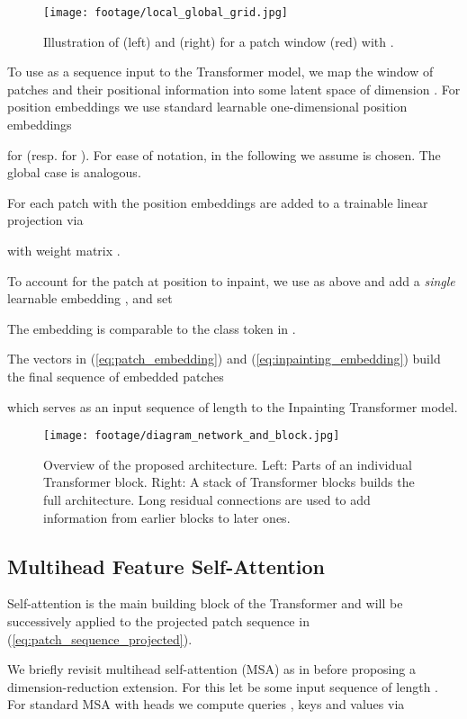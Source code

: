 \documentclass[final,5p,times,twocolumn]{elsarticle}
\begin{document}
	\begin{figure}[t]
		\centering
		\texttt{[image: footage/local\_global\_grid.jpg]}
		\caption{Illustration of  (left) and  (right) for a patch window (red) with .}
		\label{fig:window_locations}
	\end{figure}
	
	To use as a sequence input to the Transformer model, we map the window of patches and their positional information into some latent space of dimension . For position embeddings we use standard learnable one-dimensional position embeddings
	
	for  (resp.  for ). For ease of notation, in the following we assume  is chosen. The global case is analogous.
	
	For each patch  with  the position embeddings are added to a trainable linear projection via
	
	
	with weight matrix .
	
	To account for the patch at position  to inpaint, we use  as above and add a {\em single} learnable embedding , and set
	
	The embedding  is comparable to the class token in \cite{devlin2019bert}.
	
	The vectors in (\ref{eq:patch_embedding}) and (\ref{eq:inpainting_embedding}) build the final sequence of embedded patches
	
	which serves as an input sequence of length  to the Inpainting Transformer model.
	
	\begin{figure*}[t]
		\centering
		\texttt{[image: footage/diagram\_network\_and\_block.jpg]}
		\caption{Overview of the proposed architecture. Left: Parts of an individual Transformer block. Right: A stack of Transformer blocks builds the full architecture. Long residual connections are used to add information from earlier blocks to later ones.}
		\label{fig:network_architecture}
	\end{figure*}
	
	\subsection{Multihead Feature Self-Attention}
	\label{seq:mfsa}
	Self-attention is the main building block of the Transformer and will be successively applied to the projected patch sequence  in (\ref{eq:patch_sequence_projected}).
	
	We briefly revisit multihead self-attention (MSA) as in \cite{NIPS2017_3f5ee243} before proposing a dimension-reduction extension. For this let  be some input sequence of length . For standard MSA with  heads we compute queries , keys  and values  via
	
\end{document}
